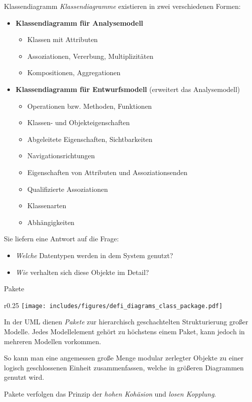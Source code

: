 \begin{defi}{Klassendiagramm}
    \emph{Klassendiagramme} existieren in zwei verschiedenen Formen:

    \begin{itemize}
        \item \textbf{Klassendiagramm für Analysemodell}
              \begin{itemize}
                  \item Klassen mit Attributen
                  \item Assoziationen, Vererbung,  Multiplizitäten
                  \item Kompositionen, Aggregationen
              \end{itemize}
        \item \textbf{Klassendiagramm für Entwurfsmodell} (erweitert das Analysemodell)
              \begin{itemize}
                  \item Operationen bzw. Methoden, Funktionen
                  \item Klassen- und Objekteigenschaften
                  \item Abgeleitete Eigenschaften, Sichtbarkeiten
                  \item Navigationsrichtungen
                  \item Eigenschaften von Attributen und Assoziationsenden
                  \item Qualifizierte Assoziationen
                  \item Klassenarten
                  \item Abhängigkeiten
              \end{itemize}
    \end{itemize}

    Sie liefern eine Antwort auf die Frage:
    \begin{itemize}
        \item \emph{Welche} Datentypen werden in dem System genutzt?
        \item \emph{Wie} verhalten sich diese Objekte im Detail?
    \end{itemize}
\end{defi}

\begin{diag}{Pakete}
    \begin{wrapfigure}{r}{0.25\textwidth}
        \centering
        \texttt{[image: includes/figures/defi\_diagrams\_class\_package.pdf]}
    \end{wrapfigure}
    In der UML dienen \emph{Pakete} zur hierarchisch geschachtelten Strukturierung großer Modelle.
    Jedes Modellelement gehört zu höchstens einem Paket, kann jedoch in mehreren Modellen vorkommen.

    So kann man eine angemessen große Menge modular zerlegter Objekte zu einer logisch geschlossenen Einheit zusammenfassen, welche in größeren Diagrammen genutzt wird.

    Pakete verfolgen das Prinzip der \emph{hohen Kohäsion} und \emph{losen Kopplung}.
\end{diag}

